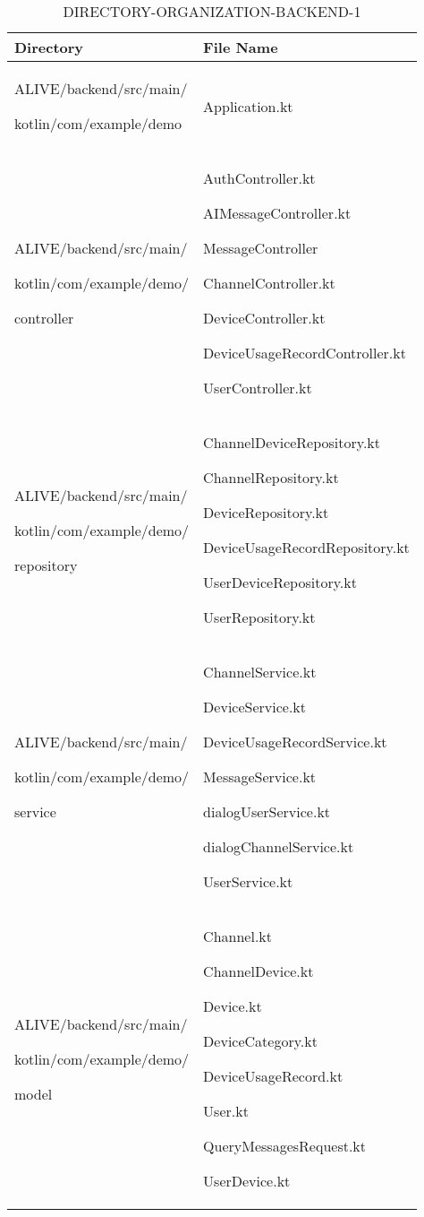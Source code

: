 \documentclass[conference]{IEEEtran}
\begin{document}
\begin{table}[h!]
\caption{DIRECTORY-ORGANIZATION-BACKEND-1}
\def\arraystretch{1.24} \small
    \begin{tabular}{|p{3.8cm}|p{4.3cm}|}
        \hline
        Directory & File Name \\ \hline
          ALIVE/backend/src/main/ \par kotlin/com/example/demo & Application.kt  \\ \hline
          
          ALIVE/backend/src/main/ \par kotlin/com/example/demo/ \par controller & AuthController.kt \par AIMessageController.kt \par \par MessageController \par ChannelController.kt \par DeviceController.kt \par DeviceUsageRecordController.kt \par UserController.kt \\ \hline
          
          ALIVE/backend/src/main/ \par kotlin/com/example/demo/ \par repository & ChannelDeviceRepository.kt \par ChannelRepository.kt \par DeviceRepository.kt \par DeviceUsageRecordRepository.kt \par UserDeviceRepository.kt \par UserRepository.kt \\ \hline
          
          ALIVE/backend/src/main/ \par kotlin/com/example/demo/ \par service & ChannelService.kt \par DeviceService.kt \par DeviceUsageRecordService.kt \par MessageService.kt \par dialogUserService.kt \par dialogChannelService.kt \par  UserService.kt \\ \hline
          
          ALIVE/backend/src/main/ \par kotlin/com/example/demo/ \par model & Channel.kt \par ChannelDevice.kt \par Device.kt \par DeviceCategory.kt \par DeviceUsageRecord.kt \par User.kt \par
          QueryMessagesRequest.kt \par 
          UserDevice.kt \\ \hline
          

\end{tabular}
\end{table}
\end{document}
